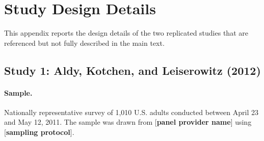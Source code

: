 \documentclass[12pt]{article}
\begin{document}
%
%
%
\newpage
\appendix
\renewcommand{\thefigure}{\thesection.\arabic{figure}}
\renewcommand{\thetable}{\thesection.\arabic{table}}

\section{Study Design Details}\label{app:study-details}

This appendix reports the design details of the two replicated studies that are referenced but not fully described in the main text.

\subsection{Study 1: Aldy, Kotchen, and Leiserowitz (2012)}

\paragraph{Sample.} Nationally representative survey of 1{,}010 U.S. adults conducted between April 23 and May 12, 2011. The sample was drawn from [\textbf{panel provider name}] using [\textbf{sampling protocol}].
\end{document}
